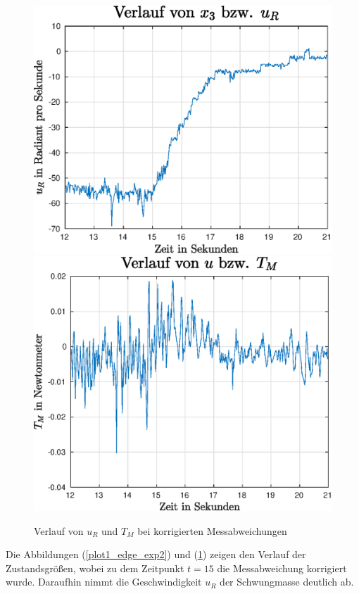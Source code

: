 \begin{figure}[h!]
\includegraphics[width=0.45\linewidth]{img/edge_exp2_ur.eps}
\includegraphics[width=0.45\linewidth]{img/edge_exp2_tm.eps}
\label{plot2_edge_exp2}
\caption{Verlauf von $u_R$ und $T_M$ bei korrigierten Messabweichungen}
\end{figure}
\newpage
Die Abbildungen (\ref{plot1_edge_exp2}) und (\ref{plot2_edge_exp2}) zeigen den Verlauf der Zustandsgrößen, wobei zu dem Zeitpunkt $t=15$ die Messabweichung korrigiert wurde. Daraufhin nimmt die Geschwindigkeit $u_R$ der Schwungmasse deutlich ab.

